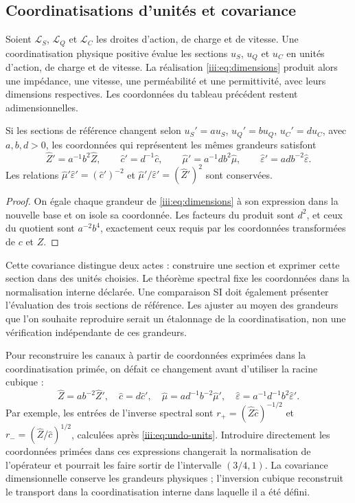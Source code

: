 \subsection{Coordinatisations d’unités et covariance}

Soient $\mathcal L_S$, $\mathcal L_Q$ et $\mathcal L_C$ les droites
d’action, de charge et de vitesse. Une coordinatisation physique positive évalue les sections
$u_S$, $u_Q$ et $u_C$ en unités d’action, de charge et de vitesse. La réalisation
\eqref{iii:eq:dimensions} produit alors une impédance, une vitesse,
une perméabilité et une permittivité, avec leurs dimensions respectives.
Les coordonnées du tableau précédent restent adimensionnelles.

\begin{proposition}
Si les sections de référence changent selon
$u_S'=a u_S$, $u_Q'=b u_Q$, $u_C'=d u_C$, avec $a,b,d>0$, les
coordonnées qui représentent les mêmes grandeurs satisfont
\[
 \widehat Z'=a^{-1}b^2\widehat Z,\qquad
 \widehat c'=d^{-1}\widehat c,\qquad
 \widehat\mu'=a^{-1}db^2\widehat\mu,\qquad
 \widehat\varepsilon'=adb^{-2}\widehat\varepsilon.
\]
Les relations $\widehat\mu'\widehat\varepsilon'=(\widehat c')^{-2}$
et $\widehat\mu'/\widehat\varepsilon'=(\widehat Z')^2$ sont conservées.
\end{proposition}
\begin{proof}
On égale chaque grandeur de \eqref{iii:eq:dimensions} à son expression
dans la nouvelle base et on isole sa coordonnée. Les facteurs du produit
sont $d^2$, et ceux du quotient sont $a^{-2}b^4$, exactement ceux requis
par les coordonnées transformées de $c$ et $Z$.
\end{proof}

Cette covariance distingue deux actes : construire une section et exprimer
cette section dans des unités choisies. Le théorème spectral fixe les coordonnées
dans la normalisation interne déclarée. Une comparaison SI doit également présenter
l’évaluation des trois sections de référence. Les ajuster
au moyen des grandeurs que l’on souhaite reproduire serait un étalonnage de
la coordinatisation, non une vérification indépendante de ces grandeurs.

Pour reconstruire les canaux à partir de coordonnées exprimées dans la coordinatisation
primée, on défait ce changement avant d’utiliser la racine cubique :
\begin{equation}
 \widehat Z=ab^{-2}\widehat Z',\quad
 \widehat c=d\widehat c',\quad
 \widehat\mu=ad^{-1}b^{-2}\widehat\mu',\quad
 \widehat\varepsilon=a^{-1}d^{-1}b^2\widehat\varepsilon'.
 \label{iii:eq:undo-units}
\end{equation}
Par exemple, les entrées de l’inverse spectral sont
$r_+=(\widehat Z\widehat c)^{-1/2}$ et
$r_-=(\widehat Z/\widehat c)^{1/2}$, calculées après
\eqref{iii:eq:undo-units}. Introduire directement les coordonnées primées
dans ces expressions changerait la normalisation de l’opérateur et pourrait
les faire sortir de l’intervalle $(3/4,1)$. La covariance dimensionnelle conserve
les grandeurs physiques ; l’inversion cubique reconstruit le transport
dans la coordinatisation interne dans laquelle il a été défini.

